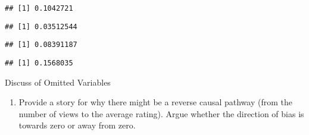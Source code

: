 \documentclass[
]{article}
\newenvironment{Shaded}{\begin{snugshade}}{\end{snugshade}}
\newcommand{\FunctionTok}[1]{\textcolor[rgb]{0.00,0.00,0.00}{#1}}
\newcommand{\NormalTok}[1]{#1}
\newcommand{\OtherTok}[1]{\textcolor[rgb]{0.56,0.35,0.01}{#1}}
\newcommand{\SpecialCharTok}[1]{\textcolor[rgb]{0.00,0.00,0.00}{#1}}
\providecommand{\tightlist}{%
  \setlength{\itemsep}{0pt}\setlength{\parskip}{0pt}}
\begin{document}
\begin{verbatim}
## [1] 0.1042721
\end{verbatim}

\begin{Shaded}
\end{Shaded}

\begin{verbatim}
## [1] 0.03512544
\end{verbatim}

\begin{Shaded}
\end{Shaded}

\begin{verbatim}
## [1] 0.08391187
\end{verbatim}

\begin{Shaded}
\end{Shaded}

\begin{verbatim}
## [1] 0.1568035
\end{verbatim}

Discuss of Omitted Variables

\begin{enumerate}
\def\labelenumi{\alph{enumi}.}
\setcounter{enumi}{1}
\tightlist
\item
  Provide a story for why there might be a reverse causal pathway (from
  the number of views to the average rating). Argue whether the
  direction of bias is towards zero or away from zero.
\end{enumerate}

\begin{Shaded}
\end{Shaded}
\end{document}
